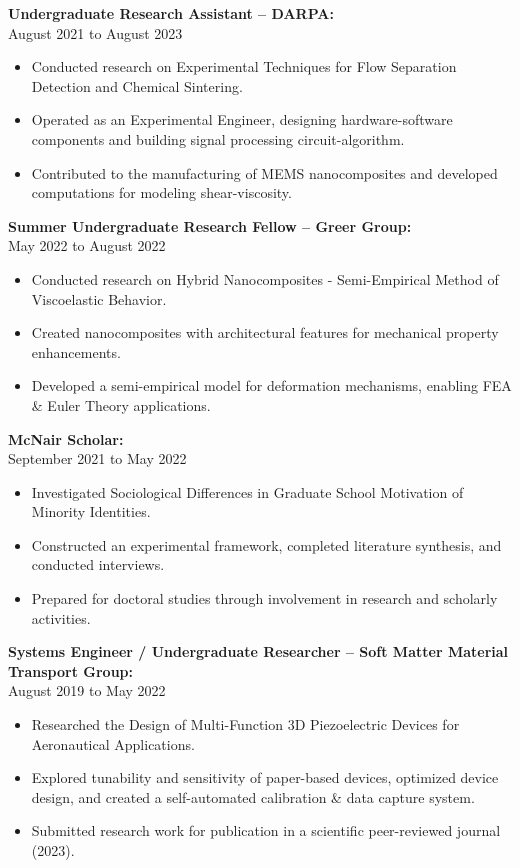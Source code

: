 \documentclass[letterpaper,10pt]{article}
\begin{document}
\textbf{Undergraduate Research Assistant – DARPA:} \\
August 2021 to August 2023
\begin{itemize}
    \item Conducted research on Experimental Techniques for Flow Separation Detection and Chemical Sintering.
    \item Operated as an Experimental Engineer, designing hardware-software components and building signal processing circuit-algorithm.
    \item Contributed to the manufacturing of MEMS nanocomposites and developed computations for modeling shear-viscosity.
\end{itemize}

\textbf{Summer Undergraduate Research Fellow – Greer Group:} \\
May 2022 to August 2022
\begin{itemize}
    \item Conducted research on Hybrid Nanocomposites - Semi-Empirical Method of Viscoelastic Behavior.
    \item Created nanocomposites with architectural features for mechanical property enhancements.
    \item Developed a semi-empirical model for deformation mechanisms, enabling FEA \& Euler Theory applications.
\end{itemize}

\textbf{McNair Scholar:} \\
September 2021 to May 2022
\begin{itemize}
    \item Investigated Sociological Differences in Graduate School Motivation of Minority Identities.
    \item Constructed an experimental framework, completed literature synthesis, and conducted interviews.
    \item Prepared for doctoral studies through involvement in research and scholarly activities.
\end{itemize}

\textbf{Systems Engineer / Undergraduate Researcher – Soft Matter Material Transport Group:} \\
August 2019 to May 2022
\begin{itemize}
    \item Researched the Design of Multi-Function 3D Piezoelectric Devices for Aeronautical Applications.
    \item Explored tunability and sensitivity of paper-based devices, optimized device design, and created a self-automated calibration \& data capture system.
    \item Submitted research work for publication in a scientific peer-reviewed journal (2023).
\end{itemize}
\end{document}
